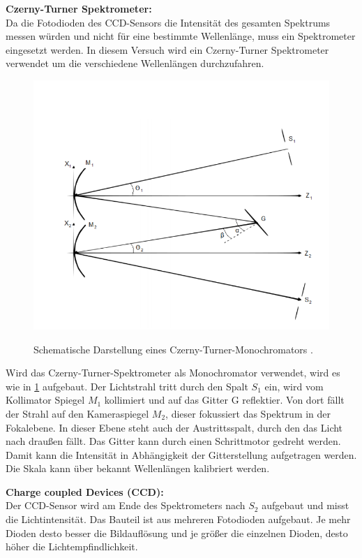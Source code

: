 \documentclass[.../bericht]{subfilies}
\begin{document}
    \textbf{Czerny-Turner Spektrometer:}\\
    Da die Fotodioden des CCD-Sensors die Intensität des gesamten Spektrums messen würden und nicht für eine bestimmte Wellenlänge, muss ein Spektrometer eingesetzt werden. In diesem Versuch wird ein Czerny-Turner Spektrometer verwendet um die verschiedene Wellenlängen durchzufahren.

    \begin{figure}[tb]
      \begin{center}
        \fbox
        {
          \includegraphics[scale=0.5]{figures/spektrometer}
        }
        \caption{Schematische Darstellung eines Czerny-Turner-Monochromators \cite{czerny}.
        }
        \label{fig:spektrometer}
      \end{center}
    \end{figure}

    Wird das Czerny-Turner-Spektrometer als Monochromator verwendet, wird es wie in \cref{fig:spektrometer} aufgebaut. Der Lichtstrahl tritt durch den Spalt $S_1$ ein, wird vom Kollimator Spiegel $M_1$ kollimiert und auf das Gitter G reflektier. Von dort fällt der Strahl auf den Kameraspiegel $M_2$, dieser fokussiert das Spektrum in der Fokalebene. In dieser Ebene steht auch der Austrittsspalt, durch den das Licht nach draußen fällt. Das Gitter kann durch einen Schrittmotor gedreht werden. Damit kann die Intensität in Abhängigkeit der Gitterstellung aufgetragen werden. Die Skala kann über bekannt Wellenlängen kalibriert werden.
    \cite{czerny}\\
    \medskip

    \textbf{Charge coupled Devices (CCD):}\\
    Der CCD-Sensor wird am Ende des Spektrometers  nach $S_2$ aufgebaut und misst die Lichtintensität. Das Bauteil ist aus mehreren Fotodioden aufgebaut. Je mehr Dioden desto besser die Bildauflösung und je größer die einzelnen Dioden, desto höher die Lichtempfindlichkeit.

    \cite{wiki:ccd}
\end{document}
